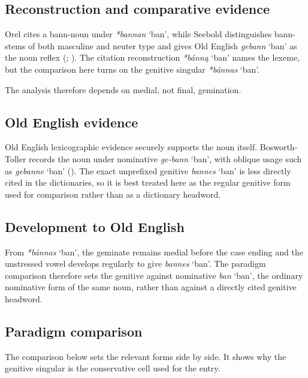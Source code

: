 \documentclass[
  british,
  a4paper,
  openany]{book}
\providecommand{\Recon}[1]{\emph{*#1}}
{\catcode`→=\active \global\def→{\ensuremath{\rightarrow}}}
\providecommand{\Recon}[1]{\emph{*#1}}
{\catcode`→=\active \global\def→{\ensuremath{\rightarrow}}}
\begin{document}
\subsection{Reconstruction and comparative
evidence}\label{reconstruction-and-comparative-evidence-108}

Orel cites a bann-noun under {\Recon{bannan} `ban'}, while Seebold
distinguishes bann-stems of both masculine and neuter type and gives Old
English {\emph{gebann}} `ban' as the noun reflex
(;
). The citation
reconstruction {\Recon{bánną} `ban'} names the lexeme, but the
comparison here turns on the genitive singular {\Recon{bánnas} `ban'}.

The analysis therefore depends on medial, not final, gemination.

\subsection{Old English evidence}\label{old-english-evidence-108}

Old English lexicographic evidence securely supports the noun itself.
Bosworth-Toller records the noun under nominative {\emph{ge-bann}}
`ban', with oblique usage such as {\emph{gebanne}} `ban'
(). The
exact unprefixed genitive {\emph{bannes}} `ban' is less directly cited
in the dictionaries, so it is best treated here as the regular genitive
form used for comparison rather than as a dictionary headword.

\subsection{Development to Old
English}\label{development-to-old-english-108}

From {\Recon{bánnas} `ban'}, the geminate remains medial before the case
ending and the unstressed vowel develops regularly to give
{\emph{bannes}} `ban'. The paradigm comparison therefore sets the
genitive against nominative {\emph{ban}} `ban', the ordinary nominative
form of the same noun, rather than against a directly cited genitive
headword.

\subsection{Paradigm comparison}\label{paradigm-comparison}

The comparison below sets the relevant forms side by side. It shows why
the genitive singular is the conservative cell used for the entry.
\end{document}
